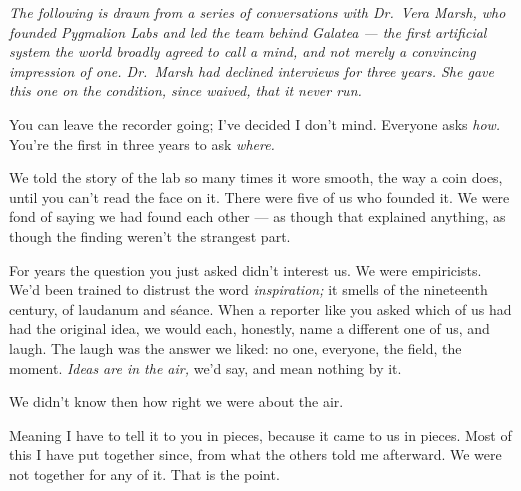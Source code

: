 
\begin{interludebody}

{\small\itshape\noindent
The following is drawn from a series of conversations with Dr.~Vera
Marsh, who founded Pygmalion Labs and led the team behind Galatea ---
the first artificial system the world broadly agreed to call a mind, and
not merely a convincing impression of one. Dr.~Marsh had declined
interviews for three years. She gave this one on the condition, since
waived, that it never run.\par}

\vspace{1.2em}


\noindent
You can leave the recorder going; I've decided I don't mind. Everyone
asks \emph{how.} You're the first in three years to ask \emph{where.}

We told the story of the lab so many times it wore smooth, the way a
coin does, until you can't read the face on it. There were five of us
who founded it. We were fond of saying we had found each other --- as
though that explained anything, as though the finding weren't the
strangest part.

For years the question you just asked didn't interest us. We were
empiricists. We'd been trained to distrust the word \emph{inspiration;}
it smells of the nineteenth century, of laudanum and s\'eance. When a
reporter like you asked which of us had had the original idea, we would
each, honestly, name a different one of us, and laugh. The laugh was the
answer we liked: no one, everyone, the field, the moment. \emph{Ideas
are in the air,} we'd say, and mean nothing by it.

We didn't know then how right we were about the air.


\noindent
Meaning I have to tell it to you in pieces, because it came to us in
pieces. Most of this I have put together since, from what the others
told me afterward. We were not together for any of it. That is the
point.


\end{interludebody}
